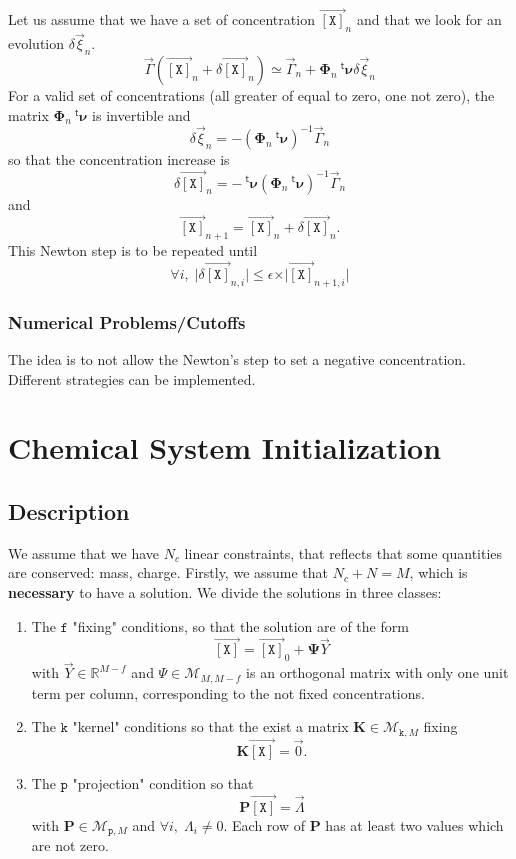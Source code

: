 \documentclass[aps,twocolumn]{revtex4}
\newcommand{\myconc}[1]{\left\lbrack #1 \right\rbrack}
\newcommand{\mychem}[1]{{\mathtt{#1}}}
\newcommand{\mymat}[1]{\boldsymbol{#1}}
\newcommand{\mytrn}[1]{{\!\!~^{\mathsf{t}}{#1}}}
\newcommand{\myvec}[1]{\overrightarrow{#1}}
\newcommand{\vecX}{\myvec{\myconc{\mychem{X}}}}
\newcommand{\fixed}{\mathtt{f}}
\newcommand{\kernel}{\mathtt{k}}
\newcommand{\proj}{\mathtt{p}}
\begin{document}
Let us assume that we have a set of concentration $\vecX_{n}$ and that we look for an evolution $\delta\vec{\xi}_{n}$.
\begin{equation}
	\vec{\Gamma}\left(\vecX_{n}+\delta\vecX_{n}\right) \simeq \vec{\Gamma}_{n} + \mymat{\Phi}_n \mytrn{\mymat{\nu}} \delta\vec{\xi}_n
\end{equation}
For a valid set of concentrations (all greater of equal to zero, one not zero), the matrix $\mymat{\Phi}_n \mytrn{\mymat{\nu}}$ is invertible
and
\begin{equation}
	\delta\vec{\xi}_n = -\left(\mymat{\Phi}_n \mytrn{\mymat{\nu}}\right)^{-1} \vec{\Gamma}_{n}
\end{equation}
so that the concentration increase is
\begin{equation}
	\delta\vecX_{n} = - \mytrn{\mymat{\nu}}\left(\mymat{\Phi}_n \mytrn{\mymat{\nu}}\right)^{-1} \vec{\Gamma}_{n}
\end{equation}
and
\begin{equation}
	\vecX_{n+1} = \vecX_{n} + \delta\vecX_{n}.
\end{equation}
This Newton step is to be repeated until
\begin{equation}
	\forall i, \; \vert\delta\vecX_{n,i}\vert \leq \epsilon \times \vert\vecX_{n+1,i}\vert
\end{equation}

\subsubsection{Numerical Problems/Cutoffs}
The idea is to not allow the Newton's step to set a negative concentration.
Different strategies can be implemented.



\section{Chemical System Initialization}
\subsection{Description}
We assume that we have $N_c$ linear constraints, that reflects that some quantities are conserved: mass, charge.
Firstly, we assume that $N_c+N=M$, which is \textbf{necessary} to have a solution.
We divide the solutions in three classes:
\begin{enumerate}
	\item The $\fixed$ "fixing" conditions, so that the solution are of the form
	$$
		\vecX = \vecX_0 + \mymat{\Psi} \vec{Y}
	$$
	with $\vec{Y}\in\mathbb{R}^{M-f}$ and $\Psi\in\mathcal{M}_{M,M-f}$ is an orthogonal matrix with only one
	unit term per column, corresponding to the not fixed concentrations.
	\item The $\kernel$ "kernel" conditions so that the exist a matrix $\mymat{K}\in\mathcal{M}_{\kernel,M}$ fixing
	$$
		\mymat{K}\vecX = \vec{0}.
	$$
	\item The $\proj$ "projection" condition so that
	$$
		\mymat{P}\vecX = \myvec{\Lambda}	
	$$
	with $\mymat{P}\in\mathcal{M}_{\proj,M}$ and $\forall i,\;\Lambda_i\not=0$. Each row of $\mymat{P}$ has at least two 
	values which are not zero.
\end{enumerate}
\end{document}
